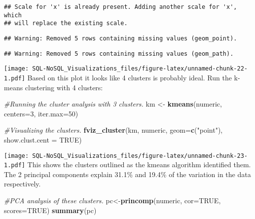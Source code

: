 \documentclass[]{article}
\newenvironment{Shaded}{\begin{snugshade}}{\end{snugshade}}
\newcommand{\KeywordTok}[1]{\textcolor[rgb]{0.13,0.29,0.53}{\textbf{#1}}}
\newcommand{\DataTypeTok}[1]{\textcolor[rgb]{0.13,0.29,0.53}{#1}}
\newcommand{\DecValTok}[1]{\textcolor[rgb]{0.00,0.00,0.81}{#1}}
\newcommand{\StringTok}[1]{\textcolor[rgb]{0.31,0.60,0.02}{#1}}
\newcommand{\CommentTok}[1]{\textcolor[rgb]{0.56,0.35,0.01}{\textit{#1}}}
\newcommand{\OtherTok}[1]{\textcolor[rgb]{0.56,0.35,0.01}{#1}}
\newcommand{\NormalTok}[1]{#1}
\begin{document}
\begin{verbatim}
## Scale for 'x' is already present. Adding another scale for 'x', which
## will replace the existing scale.
\end{verbatim}

\begin{verbatim}
## Warning: Removed 5 rows containing missing values (geom_point).
\end{verbatim}

\begin{verbatim}
## Warning: Removed 5 rows containing missing values (geom_path).
\end{verbatim}

\texttt{[image: SQL-NoSQL\_Visualizations\_files/figure-latex/unnamed-chunk-22-1.pdf]}
Based on this plot it looks like 4 clusters is probably ideal. Run the
k-means clustering with 4 clusters:

\begin{Shaded}
\begin{Highlighting}[]
\CommentTok{#Running the cluster analysis with 3 clusters.}
\NormalTok{km <-}\StringTok{ }\KeywordTok{kmeans}\NormalTok{(numeric, }\DataTypeTok{centers=}\DecValTok{3}\NormalTok{, }\DataTypeTok{iter.max=}\DecValTok{50}\NormalTok{)}

\CommentTok{#Visualizing the clusters.}
\KeywordTok{fviz_cluster}\NormalTok{(km, numeric, }\DataTypeTok{geom=}\KeywordTok{c}\NormalTok{(}\StringTok{"point"}\NormalTok{), }\DataTypeTok{show.clust.cent =} \OtherTok{TRUE}\NormalTok{)}
\end{Highlighting}
\end{Shaded}

\texttt{[image: SQL-NoSQL\_Visualizations\_files/figure-latex/unnamed-chunk-23-1.pdf]}
This shows the clusters outlined as the kmeans algorithm identified
them. The 2 principal components explain 31.1\% and 19.4\% of the
variation in the data respectively.

\begin{Shaded}
\begin{Highlighting}[]
\CommentTok{#PCA analysis of these clusters.}
\NormalTok{pc<-}\KeywordTok{princomp}\NormalTok{(numeric, }\DataTypeTok{cor=}\OtherTok{TRUE}\NormalTok{, }\DataTypeTok{scores=}\OtherTok{TRUE}\NormalTok{)}
\KeywordTok{summary}\NormalTok{(pc)}
\end{Highlighting}
\end{Shaded}
\end{document}
